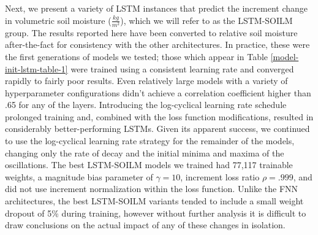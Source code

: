 Next, we present a variety of LSTM instances that predict the increment change in volumetric soil moisture ($\frac{kg}{m^2}$), which we will refer to as the LSTM-SOILM group. The results reported here have been converted to relative soil moisture after-the-fact for consistency with the other architectures. In practice, these were the first generations of models we tested; those which appear in Table \ref{model-init-lstm-table-1} were trained using a consistent learning rate and converged rapidly to fairly poor results. Even relatively large models with a variety of hyperparameter configurations didn't achieve a correlation coefficient higher than .65 for any of the layers. Introducing the log-cyclical learning rate schedule prolonged training and, combined with the loss function modifications, resulted in considerably better-performing LSTMs. Given its apparent success, we continued to use the log-cyclical learning rate strategy for the remainder of the models, changing only the rate of decay and the initial minima and maxima of the oscillations. The best LSTM-SOILM models we trained had 77,117 trainable weights, a magnitude bias parameter of $\gamma = 10$, increment loss ratio $\rho = .999$, and did not use increment normalization within the loss function. Unlike the FNN architectures, the best LSTM-SOILM variants tended to include a small weight dropout of 5\% during training, however without further analysis it is difficult to draw conclusions on the actual impact of any of these changes in isolation.

